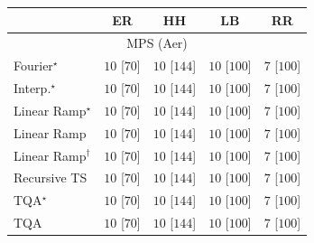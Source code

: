 \begin{tabular}{l|cccc|}
\toprule
            & ER & HH & LB & RR \\
\midrule
\multicolumn{5}{c}{\rule{0pt}{8pt}MPS (Aer)} \\
\midrule
Fourier$^\star$ & {\cellcolor[HTML]{00441B}} \color[HTML]{F1F1F1} $10$ [$70$] & {\cellcolor[HTML]{00441B}} \color[HTML]{F1F1F1} $10$ [$144$] & {\cellcolor[HTML]{00441B}} \color[HTML]{F1F1F1} $10$ [$100$] & {\cellcolor[HTML]{F7FCF5}} \color[HTML]{000000} $7$ [$100$] \\
Interp.$^\star$ & {\cellcolor[HTML]{00441B}} \color[HTML]{F1F1F1} $10$ [$70$] & {\cellcolor[HTML]{00441B}} \color[HTML]{F1F1F1} $10$ [$144$] & {\cellcolor[HTML]{00441B}} \color[HTML]{F1F1F1} $10$ [$100$] & {\cellcolor[HTML]{F7FCF5}} \color[HTML]{000000} $7$ [$100$] \\
Linear Ramp$^\star$ & {\cellcolor[HTML]{00441B}} \color[HTML]{F1F1F1} $10$ [$70$] & {\cellcolor[HTML]{00441B}} \color[HTML]{F1F1F1} $10$ [$144$] & {\cellcolor[HTML]{00441B}} \color[HTML]{F1F1F1} $10$ [$100$] & {\cellcolor[HTML]{F7FCF5}} \color[HTML]{000000} $7$ [$100$] \\
Linear Ramp & {\cellcolor[HTML]{00441B}} \color[HTML]{F1F1F1} $10$ [$70$] & {\cellcolor[HTML]{00441B}} \color[HTML]{F1F1F1} $10$ [$144$] & {\cellcolor[HTML]{00441B}} \color[HTML]{F1F1F1} $10$ [$100$] & {\cellcolor[HTML]{F7FCF5}} \color[HTML]{000000} $7$ [$100$] \\
Linear Ramp$^\dagger$ & {\cellcolor[HTML]{00441B}} \color[HTML]{F1F1F1} $10$ [$70$] & {\cellcolor[HTML]{00441B}} \color[HTML]{F1F1F1} $10$ [$144$] & {\cellcolor[HTML]{00441B}} \color[HTML]{F1F1F1} $10$ [$100$] & {\cellcolor[HTML]{F7FCF5}} \color[HTML]{000000} $7$ [$100$] \\
Recursive TS & {\cellcolor[HTML]{00441B}} \color[HTML]{F1F1F1} $10$ [$70$] & {\cellcolor[HTML]{00441B}} \color[HTML]{F1F1F1} $10$ [$144$] & {\cellcolor[HTML]{00441B}} \color[HTML]{F1F1F1} $10$ [$100$] & {\cellcolor[HTML]{F7FCF5}} \color[HTML]{000000} $7$ [$100$] \\
TQA$^\star$ & {\cellcolor[HTML]{00441B}} \color[HTML]{F1F1F1} $10$ [$70$] & {\cellcolor[HTML]{00441B}} \color[HTML]{F1F1F1} $10$ [$144$] & {\cellcolor[HTML]{00441B}} \color[HTML]{F1F1F1} $10$ [$100$] & {\cellcolor[HTML]{F7FCF5}} \color[HTML]{000000} $7$ [$100$] \\
TQA & {\cellcolor[HTML]{00441B}} \color[HTML]{F1F1F1} $10$ [$70$] & {\cellcolor[HTML]{00441B}} \color[HTML]{F1F1F1} $10$ [$144$] & {\cellcolor[HTML]{00441B}} \color[HTML]{F1F1F1} $10$ [$100$] & {\cellcolor[HTML]{F7FCF5}} \color[HTML]{000000} $7$ [$100$] \\

\end{tabular}
